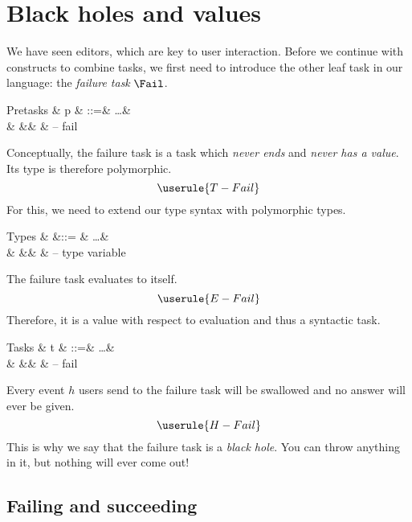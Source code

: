 
\section{Black holes and values}

We have seen editors,
which are key to user interaction.
Before we continue with constructs to combine tasks,
we first need to introduce the other leaf task in our language:
the \emph{failure task} $\Fail$.

\begin{grammar}
  Pretasks
    & p & ::=& \ldots & \\
    &   &\mid& \Fail  & – fail \\
\end{grammar}
Conceptually,
the failure task is a task which \emph{never ends} and \emph{never has a value}.
Its type is therefore polymorphic.
\begin{equation*}
  \userule{T-Fail}
\end{equation*}
For this,
we need to extend our type syntax with polymorphic types.
\begin{grammar}
  Types
    & \tau &::= & \ldots             & \\
    &      &\mid& \alpha             & – type variable \\
\end{grammar}

The failure task evaluates to itself.
\begin{equation*}
  \userule{E-Fail}
\end{equation*}
Therefore,
it is a value with respect to evaluation and thus a syntactic task.
\begin{grammar}
  Tasks
    & t & ::=& \ldots & \\
    &   &\mid& \Fail  & – fail \\
\end{grammar}

Every event $h$ users send to the failure task will be swallowed
and no answer will ever be given.
\begin{equation*}
  \userule{H-Fail}
\end{equation*}
This is why we say that the failure task is a \emph{black hole}.
You can throw anything in it,
but nothing will ever come out!


\subsection{Failing and succeeding}
\label{sec:succeeding}

